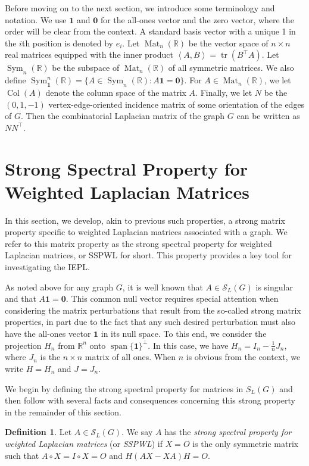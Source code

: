 \documentclass{article}
\theoremstyle{definition}
\newtheorem{definition}[theorem]{Definition}
\newcommand{\trans}{^\top}
\newcommand{\inp}[2]{\left\langle#1,#2\right\rangle}
\newcommand{\bzero}{\mathbf{0}}
\newcommand{\bone}{\mathbf{1}}
\newcommand{\tr}{\operatorname{tr}}
\newcommand{\Col}{\operatorname{Col}}
\newcommand{\vspan}{\operatorname{span}}
\newcommand{\mat}[1][n]{\operatorname{Mat}_{#1}(\mathbb{R})}
\newcommand{\msym}[1][n]{\operatorname{Sym}_{#1}(\mathbb{R})}
\newcommand{\msymz}[1][n]{\operatorname{Sym}_{\bone}^{#1}(\mathbb{R})}
\newcommand{\mptn}{\mathcal{S}}
\begin{document}
Before moving on to the next section, we introduce some terminology and notation.  We use $\bone$ and $\bzero$ for the all-ones vector and the zero vector, where the order will be clear from the context. A standard basis vector with a unique 1 in the $i$th position is denoted by $e_i$. Let $\mat$ be the vector space of $n\times n$ real matrices equipped with the inner product $\inp{A}{B} = \tr(B\trans A)$.  Let $\msym$ be the subspace of $\mat$ of all symmetric matrices.  We also define  $\msymz = \{A \in \msym: A\bone = \bzero\}$. For $A \in \mat$, we let $\Col(A)$ denote the column space of the matrix $A$. Finally, we let $N$ be the  $(0,1,-1)$ vertex-edge-oriented incidence matrix of some orientation of the edges of $G$.  Then the combinatorial Laplacian matrix of the graph $G$ can be written as $NN\trans$. 

\section{Strong Spectral Property for Weighted Laplacian Matrices}
\label{sec:sspwl}


In this section, we develop, akin to previous such properties, a strong matrix property specific to weighted Laplacian matrices associated with a graph. We refer to this matrix property as the strong spectral property for weighted Laplacian matrices, or SSPWL for short. This property provides a key tool for investigating the IEPL.

As noted above for  any graph $G$, it is well known that $A \in \mptn_L(G)$ is singular and that $A\bone = \bzero$. This common null vector requires special attention when considering the matrix perturbations that result from the so-called strong matrix properties, in part due to the fact that any such desired perturbation must also have the all-ones vector $\bone$ in its null space. To this end, we consider the projection $H_n$ from $\mathbb{R}^n$ onto $\vspan\{\bone\}^{\perp}$. In this case, we have $H_n = I_n - \frac{1}{n}J_n$, where $J_n$ is the $n\times n$ matrix of all ones.  When $n$ is obvious from the context, we write $H = H_n$ and $J=J_n$. 

We begin by defining the strong spectral property for matrices in $S_L(G)$ and then follow with  several facts and consequences concerning this strong property in the remainder of this section.


\begin{definition}
Let $A \in \mptn_L(G)$.  We say $A$ has the \emph{strong spectral property for weighted Laplacian matrices} (or \emph{SSPWL}) if $X = O$ is the only symmetric matrix such that $A\circ X = I\circ X = O$ and $H(AX - XA)H = O$.  
\end{definition}
\end{document}
